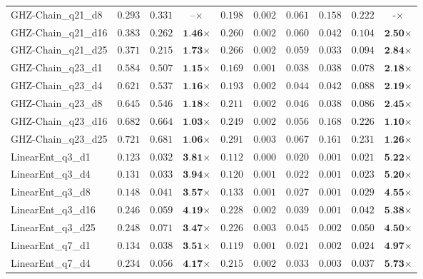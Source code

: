 \begin{table*}[t]
{\begin{tabular}{| l || r r c || r r r r r c |}
GHZ-Chain\_q21\_d8 & $0.293$ & $0.331$ & $\textbf{--}$$\times$ & $0.198$ & $0.002$ & $0.061$ & $0.158$ & $0.222$ & $\textbf{-}$$\times$ \\
GHZ-Chain\_q21\_d16 & $0.383$ & $0.262$ & $\textbf{1.46}$$\times$ & $0.260$ & $0.002$ & $0.060$ & $0.042$ & $0.104$ & $\textbf{2.50}$$\times$ \\
GHZ-Chain\_q21\_d25 & $0.371$ & $0.215$ & $\textbf{1.73}$$\times$ & $0.266$ & $0.002$ & $0.059$ & $0.033$ & $0.094$ & $\textbf{2.84}$$\times$ \\
GHZ-Chain\_q23\_d1 & $0.584$ & $0.507$ & $\textbf{1.15}$$\times$ & $0.169$ & $0.001$ & $0.038$ & $0.038$ & $0.078$ & $\textbf{2.18}$$\times$ \\
GHZ-Chain\_q23\_d4 & $0.621$ & $0.537$ & $\textbf{1.16}$$\times$ & $0.193$ & $0.002$ & $0.044$ & $0.042$ & $0.088$ & $\textbf{2.19}$$\times$ \\
GHZ-Chain\_q23\_d8 & $0.645$ & $0.546$ & $\textbf{1.18}$$\times$ & $0.211$ & $0.002$ & $0.046$ & $0.038$ & $0.086$ & $\textbf{2.45}$$\times$ \\
GHZ-Chain\_q23\_d16 & $0.682$ & $0.664$ & $\textbf{1.03}$$\times$ & $0.249$ & $0.002$ & $0.056$ & $0.168$ & $0.226$ & $\textbf{1.10}$$\times$ \\
GHZ-Chain\_q23\_d25 & $0.721$ & $0.681$ & $\textbf{1.06}$$\times$ & $0.291$ & $0.003$ & $0.067$ & $0.161$ & $0.231$ & $\textbf{1.26}$$\times$ \\
LinearEnt\_q3\_d1 & $0.123$ & $0.032$ & $\textbf{3.81}$$\times$ & $0.112$ & $0.000$ & $0.020$ & $0.001$ & $0.021$ & $\textbf{5.22}$$\times$ \\
LinearEnt\_q3\_d4 & $0.131$ & $0.033$ & $\textbf{3.94}$$\times$ & $0.120$ & $0.001$ & $0.022$ & $0.001$ & $0.023$ & $\textbf{5.20}$$\times$ \\
LinearEnt\_q3\_d8 & $0.148$ & $0.041$ & $\textbf{3.57}$$\times$ & $0.133$ & $0.001$ & $0.027$ & $0.001$ & $0.029$ & $\textbf{4.55}$$\times$ \\
LinearEnt\_q3\_d16 & $0.246$ & $0.059$ & $\textbf{4.19}$$\times$ & $0.228$ & $0.002$ & $0.039$ & $0.001$ & $0.042$ & $\textbf{5.38}$$\times$ \\
LinearEnt\_q3\_d25 & $0.248$ & $0.071$ & $\textbf{3.47}$$\times$ & $0.226$ & $0.003$ & $0.045$ & $0.002$ & $0.050$ & $\textbf{4.50}$$\times$ \\
LinearEnt\_q7\_d1 & $0.134$ & $0.038$ & $\textbf{3.51}$$\times$ & $0.119$ & $0.001$ & $0.021$ & $0.002$ & $0.024$ & $\textbf{4.97}$$\times$ \\
LinearEnt\_q7\_d4 & $0.234$ & $0.056$ & $\textbf{4.17}$$\times$ & $0.215$ & $0.002$ & $0.033$ & $0.003$ & $0.037$ & $\textbf{5.73}$$\times$ \\

\end{tabular}}
\end{table*}
